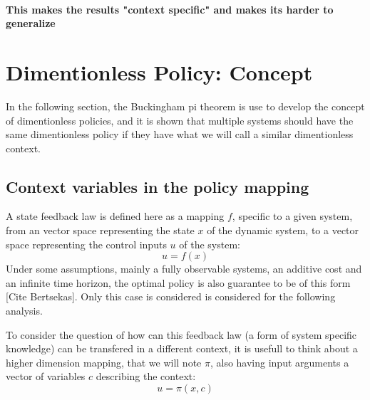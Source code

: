 \paragraph{This makes the results "context specific" and makes its harder to generalize }






\section{Dimentionless Policy: Concept}
\label{sec:dimenanalysis}

In the following section, the Buckingham pi theorem is use to develop the concept of dimentionless policies, and it is shown that multiple systems should have the same dimentionless policy if they have what we will call a similar dimentionless context.

\subsection{Context variables in the policy mapping}

A state feedback law is defined here as a mapping $f$, specific to a given system,  from an vector space representing the state $x$ of the dynamic system, to a vector space representing the control inputs $u$ of the system:
\begin{equation}
u
=
f \left(
x
\right)
\end{equation}
Under some assumptions, mainly a fully observable systems, an additive cost and an infinite time horizon, the optimal policy is also guarantee to be of this form [Cite Bertsekas]. Only this case is considered is considered for the following analysis.

To consider the question of how can this feedback law (a form of system specific knowledge) can be transfered in a different context, it is usefull to think about a higher dimension mapping, that we will note $\pi$, also having input arguments a vector of variables $c$ describing the context:
\begin{equation}
u
=
\pi \left(
x,
c
\right)
\end{equation}

